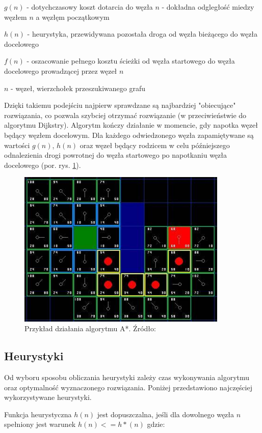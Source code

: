  $g(n)$ - dotychczasowy koszt dotarcia do węzła $n$ - dokładna odgległość miedzy węzłem $n$ a węzłęm początkowym

 $h(n)$ - heurystyka, przewidywana pozostała droga od węzła bieżącego do węzła docelowego

 $f(n)$ - oszacowanie pełnego kosztu ścieżki od węzła startowego do węzła docelowego prowadzącej przez węzeł $n$

 $n$ - węzeł, wierzchołek przeszukiwanego grafu

Dzięki takiemu podejściu najpierw sprawdzane są najbardziej "obiecujące" rozwiązania, co pozwala szybciej otrzymać rozwiązanie (w przeciwieństwie do algorytmu Dijkstry).
Algorytm kończy działanie w momencie, gdy napotka węzeł będący węzłem docelowym.
Dla każdego odwiedzonego węzła zapamiętywane są wartości $g(n)$, $h(n)$ oraz węzeł będący rodzicem w celu późniejszego odnalezienia drogi powrotnej do węzła startowego po napotkaniu węzła docelowego (por. rys. \ref{fig:image_astar2}).

\begin{figure}[H]
	\centering
	\includegraphics[width=10cm]{img/astar-t7}
	\caption{Przykład działania algorytmu A*. Źródło: \cite{astar2}}
	\label{fig:image_astar2}
\end{figure}

\subsection{Heurystyki}
Od wyboru sposobu obliczania heurystyki zależy czas wykonywania algorytmu oraz optymalność wyznaczonego rozwiązania.
Poniżej przedstawiono najczęściej wykorzystywane heurystyki.

Funkcja heurystyczna $h(n)$ jest dopuszczalna, jeśli dla dowolnego węzła $n$ spełniony jest warunek $h(n) <= h*(n)$
 gdzie:

